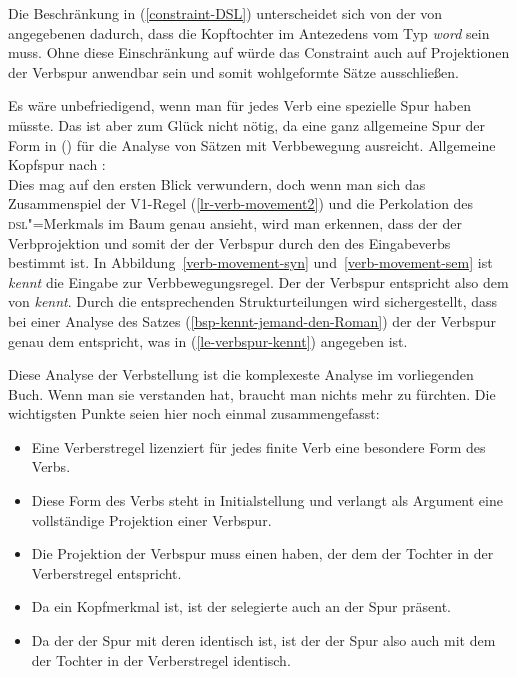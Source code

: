 Die Beschränkung in (\ref{constraint-DSL}) unterscheidet sich von der von
\citet[]{Meurers2000b} angegebenen \ua dadurch, dass die Kopftochter im Antezedens vom Typ
\emph{word} sein muss. Ohne diese Einschränkung auf  würde das Constraint auch auf
Projektionen der Verbspur anwendbar sein und somit wohlgeformte Sätze ausschließen.



Es wäre unbefriedigend, wenn man für jedes Verb eine spezielle Spur haben müsste. Das ist aber 
zum Glück nicht nötig, da eine ganz allgemeine Spur der Form in () für die Analyse
von Sätzen mit Verbbewegung ausreicht.
\eas
\label{le-verbspur}%
Allgemeine Kopfspur nach \citet[207]{Meurers2000b}:\\
\zs
Dies mag auf den ersten Blick verwundern, doch wenn man sich das Zusammenspiel der V1-Regel
(\ref{lr-verb-movement2}) und die Perkolation des \textsc{dsl}"=Merkmals im Baum genau ansieht, wird
man erkennen, dass der \dslw der Verbprojektion und somit der \localw der Verbspur durch den
\localw des Eingabeverbs bestimmt ist. In Abbildung~\ref{verb-movement-syn} und~\ref{verb-movement-sem}
ist \emph{kennt} die Eingabe zur Verbbewegungsregel. Der \localw der Verbspur entspricht
also dem \localw von \emph{kennt}. Durch die entsprechenden Strukturteilungen wird  sichergestellt,
dass bei einer Analyse des Satzes (\ref{bsp-kennt-jemand-den-Roman}) der \localw der Verbspur genau dem entspricht, was in
(\ref{le-verbspur-kennt}) angegeben ist.

Diese Analyse der Verbstellung ist die komplexeste Analyse im vorliegenden Buch. Wenn man sie verstanden
hat, braucht man nichts mehr zu fürchten. Die wichtigsten Punkte seien hier noch einmal zusammengefasst:
\begin{itemize}
\item Eine Verberstregel lizenziert für jedes finite Verb eine besondere Form des Verbs.
\item Diese Form des Verbs steht in Initialstellung und verlangt als Argument eine vollständige Projektion
      einer Verbspur.
\item Die Projektion der Verbspur muss einen \dslw haben, der dem \localw der Tochter in der Verberstregel
      entspricht.
\item Da \dsl ein Kopfmerkmal ist, ist der selegierte \dslw auch an der Spur präsent.
\item Da der \dslw der Spur mit deren \localw identisch ist, ist der \localw der Spur also
      auch mit dem \localw der Tochter in der Verberstregel identisch.
\end{itemize}

